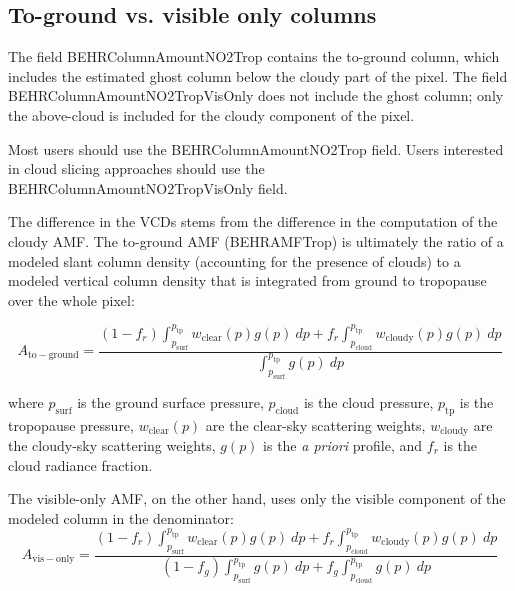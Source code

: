 \documentclass[12pt]{article}
\begin{document}
	
	\subsection{To-ground vs. visible only columns}
	The field BEHRColumnAmountNO2Trop contains the to-ground column, which includes the estimated ghost column below the cloudy part of the pixel. The field BEHRColumnAmountNO2TropVisOnly does not include the ghost column; only the above-cloud  is included for the cloudy component of the pixel.
	
	Most users should use the BEHRColumnAmountNO2Trop field. Users interested in cloud slicing approaches should use the BEHRColumnAmountNO2TropVisOnly field. 
	
	The difference in the VCDs stems from the difference in the computation of the cloudy AMF. The to-ground AMF (BEHRAMFTrop) is ultimately the ratio of a modeled slant column density (accounting for the presence of clouds) to a modeled vertical column density that is integrated from ground to tropopause over the whole pixel:
	
	\begin{equation}\label{eqn:total-amf}
	A_{\mathrm{to-ground}} = \frac{(1-f_r) \int_{p_{\mathrm{surf}}}^{p_{\mathrm{tp}}} w_{\mathrm{clear}}(p) g(p) \: dp + f_r \int_{p_{\mathrm{cloud}}}^{p_{\mathrm{tp}}} w_{\mathrm{cloudy}}(p) g(p) \: dp}{\int_{p_{\mathrm{surf}}}^{p_\mathrm{tp}} g(p) \: dp}
	\end{equation}
	
	where $p_{\mathrm{surf}}$ is the ground surface pressure, $p_{\mathrm{cloud}}$ is the cloud pressure, $p_{\mathrm{tp}}$ is the tropopause pressure, $w_{\mathrm{clear}}(p)$ are the clear-sky scattering weights, $w_{\mathrm{cloudy}}$ are the cloudy-sky scattering weights, $g(p)$ is the \emph{a priori}  profile, and $f_r$ is the cloud radiance fraction.	
	
	The visible-only AMF, on the other hand, uses only the visible component of the modeled column in the denominator:
	\begin{equation}\label{eqn:vis-amf}
	A_{\mathrm{vis-only}} = \frac{(1-f_r) \int_{p_{\mathrm{surf}}}^{p_{\mathrm{tp}}} w_{\mathrm{clear}}(p) g(p) \: dp + f_r \int_{p_{\mathrm{cloud}}}^{p_{\mathrm{tp}}} w_{\mathrm{cloudy}}(p) g(p) \: dp}%
{(1-f_g)\int_{p_{\mathrm{surf}}}^{p_\mathrm{tp}} g(p) \: dp + f_g \int_{p_{\mathrm{cloud}}}^{p_\mathrm{tp}} g(p) \: dp}
	\end{equation}
	
\end{document}
